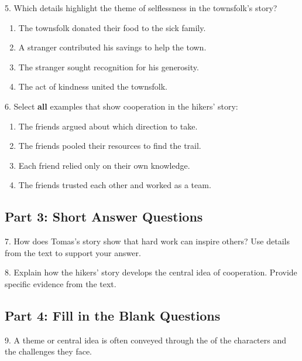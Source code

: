 \documentclass[12pt]{article}
\begin{document}
\vspace{1cm}

5. Which details highlight the theme of selflessness in the townsfolk’s story?  
\begin{enumerate}[label=\Alph*.]
    \item The townsfolk donated their food to the sick family.  
    \item A stranger contributed his savings to help the town.  
    \item The stranger sought recognition for his generosity.  
    \item The act of kindness united the townsfolk.  
\end{enumerate}

\vspace{1cm}

6. Select \textbf{all} examples that show cooperation in the hikers’ story:  
\begin{enumerate}[label=\Alph*.]
    \item The friends argued about which direction to take.  
    \item The friends pooled their resources to find the trail.  
    \item Each friend relied only on their own knowledge.  
    \item The friends trusted each other and worked as a team.  
\end{enumerate}

\vspace{1cm}

\subsection*{Part 3: Short Answer Questions}

7. How does Tomas’s story show that hard work can inspire others? Use details from the text to support your answer.  
\vspace{4cm}

8. Explain how the hikers’ story develops the central idea of cooperation. Provide specific evidence from the text.  
\vspace{4cm}

\subsection*{Part 4: Fill in the Blank Questions}

9. A theme or central idea is often conveyed through the \underline{\hspace{4cm}} of the characters and the challenges they face.  
\vspace{2cm}
\end{document}
